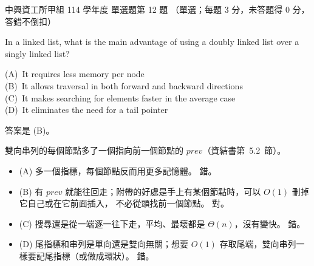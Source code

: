 \begin{pastexam}[label={px:nchu-114-dsa-12}]{中興資工所甲組 114 學年度 單選題第 12 題}
（單選；每題 3 分，未答題得 0 分，答錯不倒扣）

In a linked list, what is the main advantage of using a doubly linked list over a singly linked list?

(A)~It requires less memory per node\\
(B)~It allows traversal in both forward and backward directions\\
(C)~It makes searching for elements faster in the average case\\
(D)~It eliminates the need for a tail pointer
\end{pastexam}

\begin{pastsoln}
答案是 (B)。

雙向串列的每個節點多了一個指向前一個節點的 $\mathit{prev}$（資結書第~5.2~節）。
\begin{itemize}
\item (A) 多一個指標，每個節點反而用更多記憶體。 錯。
\item (B) 有 $\mathit{prev}$ 就能往回走；附帶的好處是手上有某個節點時，可以 $O(1)$ 刪掉它自己或在它前面插入，
不必從頭找前一個節點。 對。
\item (C) 搜尋還是從一端逐一往下走，平均、最壞都是 $\Theta(n)$，沒有變快。 錯。
\item (D) 尾指標和串列是單向還是雙向無關；想要 $O(1)$ 存取尾端，雙向串列一樣要記尾指標（或做成環狀）。 錯。
\end{itemize}
\end{pastsoln}
